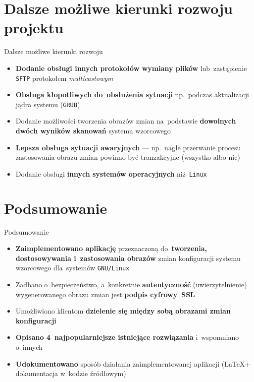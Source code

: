 \documentclass[notes,polish,xcolor=dvipsnames,hyperref={unicode,hidelinks,pdftex,pdfauthor={Patryk Bęza},pdftitle={Protokół zarządzania stacjami komputerowymi pod kontrolą systemu Linux},pdfsubject={Praca dyplomowa magisterska na Wydziale Matematyki i Nauk Informacyjnych Politechniki Warszawskiej},pdfkeywords={Software Configuration Management, SCM, Infrastructure as Code, IaC, Linux, Communications Protocol},pdfproducer={XeLaTeX},pdfcreator={latexmk}}]{beamer}
\begin{document}

\section{Dalsze możliwe kierunki rozwoju projektu}

\begin{frame}{Dalsze możliwe kierunki rozwoju}

\begin{itemize}
	\item \textbf{Dodanie obsługi innych protokołów wymiany plików} lub~zastąpienie \texttt{SFTP} protokołem \emph{multicastowym}
	\item \textbf{Obsługa kłopotliwych do~obsłużenia sytuacji} np.~podczas aktualizacji jądra systemu (\texttt{GRUB})
	\item Dodanie możliwości tworzenia obrazów zmian na~podstawie \textbf{dowolnych dwóch wyników skanowań} systemu wzorcowego
	\item \textbf{Lepsza obsługa sytuacji awaryjnych} --- np.~nagłe przerwanie procesu zastosowania obrazu zmian powinno być tranzakcyjne (wszystko albo nic)
	\item Dodanie obsługi \textbf{innych systemów operacyjnych} niż~\texttt{Linux}
\end{itemize}

\end{frame}


\section{Podsumowanie}

\begin{frame}{Podsumowanie}

\begin{itemize}
	\item \textbf{Zaimplementowano aplikację} przeznaczoną do~\textbf{tworzenia, dostosowywania i~zastosowania obrazów} zmian konfiguracji systemu wzorcowego dla~systemów \texttt{GNU/Linux}
	\item Zadbano o~bezpieczeństwo, a~konkretnie \textbf{autentyczność} (uwierzytelnienie) wygenerowanego obrazu zmian jest \textbf{podpis cyfrowy~SSL}
	\item Umożliwiono klientom \textbf{dzielenie się między sobą obrazami zmian konfiguracji}
	\item \textbf{Opisano 4~najpopularniejsze istniejące rozwiązania} i~wspomniano o~innych
	\item \textbf{Udokumentowano} sposób działania zaimplementowanej aplikacji (\LaTeX + dokumentacja w~kodzie źródłowym)
\end{itemize}

\end{frame}
\end{document}
